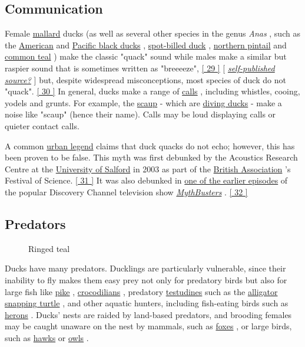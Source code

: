 \documentclass[11pt,a4paper]{article}
\begin{document}
\subsection{Communication}

Female \href{/wiki/Mallard}{mallard} ducks (as well as several other species in the genus \textit{Anas} , such as the \href{/wiki/American\_black\_duck}{American} and \href{/wiki/Pacific\_black\_duck}{Pacific black ducks} , \href{/wiki/Spot-billed\_duck}{spot-billed duck} , \href{/wiki/Northern\_pintail}{northern pintail} and \href{/wiki/Common\_teal}{common teal} ) make the classic "quack" sound while males make a similar but raspier sound that is sometimes written as "breeeeze", \href{\#cite\_note-29}{[ 29 ]} [ \href{/wiki/Wikipedia:Verifiability\#Self-published\_sources}{\textit{self-published source?}} ] but, despite widespread misconceptions, most species of duck do not "quack". \href{\#cite\_note-30}{[ 30 ]} In general, ducks make a range of \href{/wiki/Bird\_vocalisation}{calls} , including whistles, cooing, yodels and grunts. For example, the \href{/wiki/Scaup}{scaup} - which are \href{/wiki/Diving\_duck}{diving ducks} - make a noise like "scaup" (hence their name). Calls may be loud displaying calls or quieter contact calls.

A common \href{/wiki/Urban\_legend}{urban legend} claims that duck quacks do not echo; however, this has been proven to be false. This myth was first debunked by the Acoustics Research Centre at the \href{/wiki/University\_of\_Salford}{University of Salford} in 2003 as part of the \href{/wiki/British\_Association}{British Association} 's Festival of Science. \href{\#cite\_note-31}{[ 31 ]} It was also debunked in \href{/wiki/MythBusters\_(2003\_season)\#Does\_a\_Duck's\_Quack\_Echo?}{one of the earlier episodes} of the popular Discovery Channel television show \href{/wiki/MythBusters}{\textit{MythBusters}} . \href{\#cite\_note-32}{[ 32 ]}

\subsection{Predators}

\begin{figure}[h]
\caption{Ringed teal}
\end{figure}

Ducks have many predators. Ducklings are particularly vulnerable, since their inability to fly makes them easy prey not only for predatory birds but also for large fish like \href{/wiki/Esox}{pike} , \href{/wiki/Crocodilia}{crocodilians} , predatory \href{/wiki/Testudines}{testudines} such as the \href{/wiki/Alligator\_snapping\_turtle}{alligator snapping turtle} , and other aquatic hunters, including fish-eating birds such as \href{/wiki/Heron}{herons} . Ducks' nests are raided by land-based predators, and brooding females may be caught unaware on the nest by mammals, such as \href{/wiki/Fox}{foxes} , or large birds, such as \href{/wiki/Hawk}{hawks} or \href{/wiki/Owl}{owls} .
\end{document}
